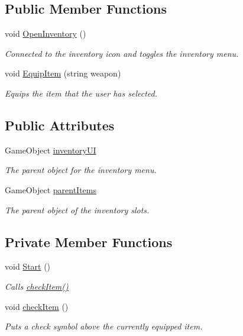 \subsection*{Public Member Functions}
\begin{DoxyCompactItemize}
\item 
void \mbox{\hyperlink{class_u_i_controller_a18e9df9cf6f6b018a0c9e2baa8f4e0c9}{Open\+Inventory}} ()
\begin{DoxyCompactList}\small\item\em Connected to the inventory icon and toggles the inventory menu. \end{DoxyCompactList}\item 
void \mbox{\hyperlink{class_u_i_controller_a27a528e3022c45a9b94cce0d9b072762}{Equip\+Item}} (string weapon)
\begin{DoxyCompactList}\small\item\em Equips the item that the user has selected. \end{DoxyCompactList}\end{DoxyCompactItemize}
\subsection*{Public Attributes}
\begin{DoxyCompactItemize}
\item 
Game\+Object \mbox{\hyperlink{class_u_i_controller_a4c46a34bd06dccf8d8824da40c677fdb}{inventory\+UI}}
\begin{DoxyCompactList}\small\item\em The parent object for the inventory menu. \end{DoxyCompactList}\item 
Game\+Object \mbox{\hyperlink{class_u_i_controller_a5cd04315c42b8c0acf858e49c7d955be}{parent\+Items}}
\begin{DoxyCompactList}\small\item\em The parent object of the inventory slots. \end{DoxyCompactList}\end{DoxyCompactItemize}
\subsection*{Private Member Functions}
\begin{DoxyCompactItemize}
\item 
void \mbox{\hyperlink{class_u_i_controller_a676b3b972c33885db4565ee43f23e459}{Start}} ()
\begin{DoxyCompactList}\small\item\em Calls \mbox{\hyperlink{class_u_i_controller_a9ea46066b8e67d6f3c65a69e94ad3b53}{check\+Item()}} \end{DoxyCompactList}\item 
void \mbox{\hyperlink{class_u_i_controller_a9ea46066b8e67d6f3c65a69e94ad3b53}{check\+Item}} ()
\begin{DoxyCompactList}\small\item\em Puts a check symbol above the currently equipped item. \end{DoxyCompactList}\end{DoxyCompactItemize}



